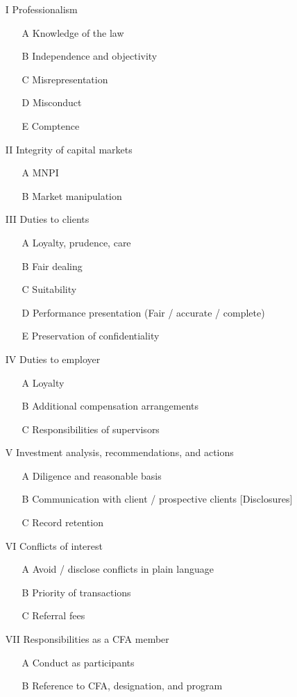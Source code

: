 \documentclass[../notes_compiled.tex]{subfiles}
\begin{document}
\begin{multicols}{2}
\begin{itemize}
\item[I] Professionalism
\begin{itemize}
\item[A] Knowledge of the law
\item[B] Independence and objectivity
\item[C] Misrepresentation
\item[D] Misconduct
\item[E] Comptence
\end{itemize}
\item[II] Integrity of capital markets
\begin{itemize}
\item[A] MNPI
\item[B] Market manipulation
\end{itemize}
\item[III] Duties to clients
\begin{itemize}
\item[A] Loyalty, prudence, care
\item[B] Fair dealing
\item[C] Suitability
\item[D] Performance presentation (Fair / accurate / complete)
\item[E] Preservation of confidentiality
\end{itemize}
\item[IV] Duties to employer
\begin{itemize}
\item[A] Loyalty
\item[B] Additional compensation arrangements
\item[C] Responsibilities of supervisors
\end{itemize}
\item[V] Investment analysis, recommendations, and actions
\begin{itemize}
\item[A] Diligence and reasonable basis
\item[B] Communication with client / prospective clients [Disclosures]
\item[C] Record retention
\end{itemize}
\item[VI] Conflicts of interest
\begin{itemize}
\item[A] Avoid / disclose conflicts in plain language
\item[B] Priority of transactions
\item[C] Referral fees
\end{itemize}
\item[VII] Responsibilities as a CFA member
\begin{itemize}
\item[A] Conduct as participants
\item[B] Reference to CFA, designation, and program
\end{itemize}
\end{itemize}
\end{multicols}
\end{document}
